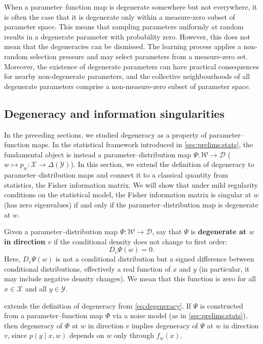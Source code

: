 \documentclass[11pt]{article}
\newcommand{\X}{\mathcal{X}}
\newcommand{\Y}{\mathcal{Y}}
\newcommand{\W}{\mathcal{W}}
\newcommand{\D}{\mathcal{D}}
\begin{document}
\begin{remark}
    When a parameter--function map is degenerate somewhere but not everywhere, it
    is often the case that it is degenerate only within a measure-zero subset
    of parameter space.
    This means that sampling parameters uniformly at random
    results in a degenerate parameter with probability zero.
    However, this does not mean that the degeneracies can be dismissed. The
    learning process applies a non-random selection pressure and may select
    parameters from a measure-zero set. Moreover, the existence of degenerate
    parameters can have practical consequences for nearby non-degenerate
    parameters, and the collective neighbourhoods of all degenerate parameters
    comprise a non-measure-zero subset of parameter space.
\end{remark}

\subsection{Degeneracy and information singularities}

In the preceding sections, we studied degeneracy as a property of
parameter--function maps. In the statistical framework introduced in
\cref{sec:prelims:stats}, the fundamental object is instead a
parameter--distribution map $\Psi : \W \to \D$ ($w \mapsto p_w : \X \to
\Delta(\Y)$). In this section, we extend the definition of degeneracy to
parameter--distribution maps and connect it to a classical quantity from
statistics, the Fisher information matrix. We will show that under mild
regularity conditions on the statistical model, the Fisher information matrix
is singular at $w$ (has zero eigenvalues) if and only if the parameter--distribution
map is degenerate at $w$.

Given a parameter--distribution map $\Psi : \W \to \D$, say that $\Psi$ is
\textbf{degenerate at $w$ in direction $v$} if the conditional density does
not change to first order:
\begin{equation}\label{eq:dist-degeneracy}
    D_v \Psi(w) = 0.
\end{equation}
Here, $D_v \Psi(w)$ is not a conditional distribution but a signed difference
between conditional distributions, effectively a real function of $x$ and $y$
(in particular, it may include negative density changes). We mean that this
function is zero for all $x \in \X$ and all $y \in \Y$.

 extends the definition of degeneracy from
\cref{eq:degeneracy}. If $\Psi$ is constructed from a parameter--function map
$\Phi$ via a noise model (as in \cref{sec:prelims:stats}), then degeneracy of
$\Phi$ at $w$ in direction $v$ implies degeneracy of $\Psi$ at $w$ in direction
$v$, since $p(y \mid x, w)$ depends on $w$ only through $f_w(x)$.
\end{document}
